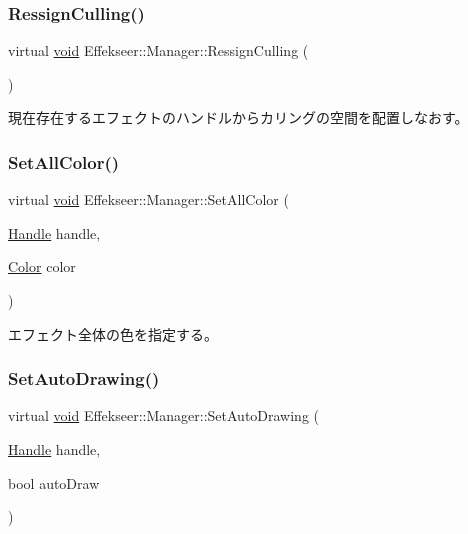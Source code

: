 \subsubsection{\texorpdfstring{Ressign\+Culling()}{RessignCulling()}}
{\footnotesize\ttfamily virtual \mbox{\hyperlink{namespace_effekseer_ab34c4088e512200cf4c2716f168deb56}{void}} Effekseer\+::\+Manager\+::\+Ressign\+Culling (\begin{DoxyParamCaption}{ }\end{DoxyParamCaption})\hspace{0.3cm}{\ttfamily [pure virtual]}}



現在存在するエフェクトのハンドルからカリングの空間を配置しなおす。 

\mbox{\label{class_effekseer_1_1_manager_ae0613bf8762c0948d9361d558ba4b56b}} 
\subsubsection{\texorpdfstring{Set\+All\+Color()}{SetAllColor()}}
{\footnotesize\ttfamily virtual \mbox{\hyperlink{namespace_effekseer_ab34c4088e512200cf4c2716f168deb56}{void}} Effekseer\+::\+Manager\+::\+Set\+All\+Color (\begin{DoxyParamCaption}\item[{\mbox{\hyperlink{namespace_effekseer_afba58b8d812da862190e9bbfc040824a}{Handle}}}]{handle,  }\item[{\mbox{\hyperlink{struct_effekseer_1_1_color}{Color}}}]{color }\end{DoxyParamCaption})\hspace{0.3cm}{\ttfamily [pure virtual]}}



エフェクト全体の色を指定する。 

\mbox{\label{class_effekseer_1_1_manager_a3829cb7c98f3c41d79394eead1eaaa04}} 
\subsubsection{\texorpdfstring{Set\+Auto\+Drawing()}{SetAutoDrawing()}}
{\footnotesize\ttfamily virtual \mbox{\hyperlink{namespace_effekseer_ab34c4088e512200cf4c2716f168deb56}{void}} Effekseer\+::\+Manager\+::\+Set\+Auto\+Drawing (\begin{DoxyParamCaption}\item[{\mbox{\hyperlink{namespace_effekseer_afba58b8d812da862190e9bbfc040824a}{Handle}}}]{handle,  }\item[{bool}]{auto\+Draw }\end{DoxyParamCaption})\hspace{0.3cm}{\ttfamily [pure virtual]}}



